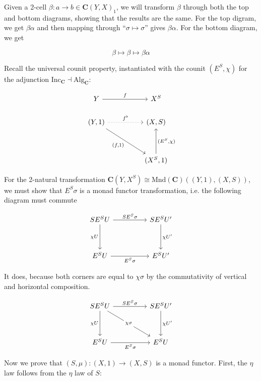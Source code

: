 \documentclass{article}
\newcommand{\mbf}{\mathbf}
\begin{document}
Given a 2-cell $\beta : a \to b \in \mbf{C}(Y,X)_1$, we will transform $\beta$ through both the top and bottom diagrams, showing that the results are the same. For the top digram, we get $\beta \alpha$ and then mapping through ``$\sigma \mapsto \sigma$'' gives $\beta \alpha$. For the bottom diagram, we get

$$\beta \mapsto \beta \mapsto \beta \alpha$$

Recall the universal counit property, instantiated with the counit $(E^S,\chi)$ for the adjunction $\text{Inc}_{\mbf C} \dashv \text{Alg}_{\mbf C}$:

\[\begin{tikzcd}
	Y && {X^S} \\
	{(Y,1)} && {(X,S)} \\
	\\
	&& {(X^S,1)}
	\arrow["f", from=1-1, to=1-3]
	\arrow["{(E^S,\chi)}"', from=4-3, to=2-3]
	\arrow["{(f,1)}"', from=2-1, to=4-3]
	\arrow["{f^\flat}", dotted, from=2-1, to=2-3]
\end{tikzcd}\]

For the 2-natural transformation $\mbf{C}(Y,X^S) \cong \text{Mnd}(\mbf C)((Y,1),(X,S))$, we must show that $E^S \sigma$ is a monad functor transformation, i.e. the following diagram must commute

\[\begin{tikzcd}
	{S E^S U} && {S E^S U'} \\
	\\
	{E^S U} && {E^S U'}
	\arrow["{\chi U}"', from=1-1, to=3-1]
	\arrow["{S E^S \sigma}", from=1-1, to=1-3]
	\arrow["{\chi U'}", from=1-3, to=3-3]
	\arrow["{E^S \sigma}"', from=3-1, to=3-3]
\end{tikzcd}\]

It does, because both corners are equal to $\chi \sigma$ by the commutativity of vertical and horizontal composition.

\[\begin{tikzcd}
	{S E^S U} && {S E^S U'} \\
	\\
	{E^SU} && {E^SU}
	\arrow["{S E^S \sigma}", from=1-1, to=1-3]
	\arrow["{\chi U}"', from=1-1, to=3-1]
	\arrow["{\chi U'}", from=1-3, to=3-3]
	\arrow["{E^S \sigma}"', from=3-1, to=3-3]
	\arrow["{\chi \sigma}"{description}, from=1-1, to=3-3]
\end{tikzcd}\]

Now we prove that $(S,\mu) : (X,1) \to (X,S)$ is a monad functor. First, the $\eta$ law follows from the $\eta$ law of $S$:
\end{document}
